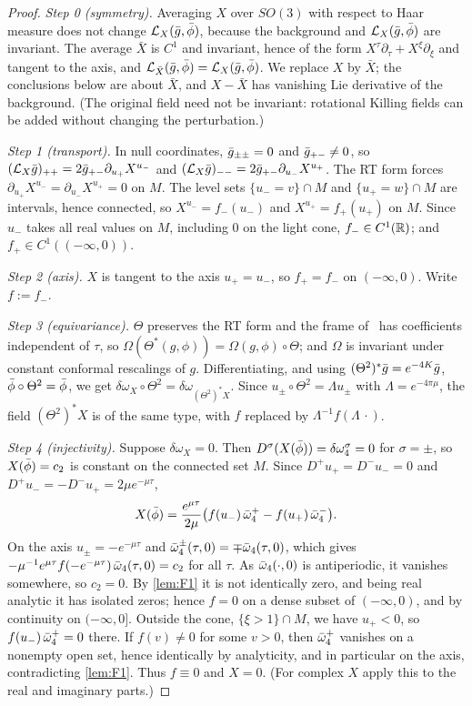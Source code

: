 \begin{proof}
\emph{Step 0 (symmetry).} Averaging $X$ over $SO(3)$ with respect to Haar measure does not change
$\mathcal{L}_X(\bar g,\bar\phi)$, because the background and $\mathcal{L}_X(\bar g,\bar\phi)$ are invariant. The average $\bar X$ is
$C^1$ and invariant, hence of the form $X^\tau\partial_\tau+X^\xi\partial_\xi$ and tangent to the axis, and
$\mathcal{L}_{\bar X}(\bar g,\bar\phi)=\mathcal{L}_X(\bar g,\bar\phi)$. We replace $X$ by $\bar X$; the conclusions below are about
$\bar X$, and $X-\bar X$ has vanishing Lie derivative of the background. (The original field need not be
invariant: rotational Killing fields can be added without changing the perturbation.)

\emph{Step 1 (transport).} In null coordinates, $\bar g_{\pm\pm}=0$ and $\bar g_{+-}\neq0$, so
$(\mathcal{L}_X\bar g)_{++}=2\bar g_{+-}\partial_{u_+}X^{u_-}$ and $(\mathcal{L}_X\bar g)_{--}=2\bar g_{+-}\partial_{u_-}X^{u_+}$.
The RT form forces $\partial_{u_+}X^{u_-}=\partial_{u_-}X^{u_+}=0$ on $M$. The level sets
$\{u_-=v\}\cap M$ and $\{u_+=w\}\cap M$ are intervals, hence connected, so $X^{u_-}=f_-(u_-)$ and
$X^{u_+}=f_+(u_+)$ on $M$. Since $u_-$ takes all real values on $M$, including $0$ on the light cone,
$f_-\in C^1(\mathbb{R})$; and $f_+\in C^1((-\infty,0))$.

\emph{Step 2 (axis).} $X$ is tangent to the axis $u_+=u_-$, so $f_+=f_-$ on $(-\infty,0)$. Write $f:=f_-$.

\emph{Step 3 (equivariance).} $\Theta$ preserves the RT form and the frame of~\cite{RT2019} has coefficients
independent of $\tau$, so $\Omega(\Theta^*(g,\phi))=\Omega(g,\phi)\circ\Theta$; and $\Omega$ is invariant under
constant conformal rescalings of $g$. Differentiating, and using $(\Theta^2)^*\bar g=e^{-4K}\bar g$,
$\bar\phi\circ\Theta^2=\bar\phi$, we get $\delta\omega_X\circ\Theta^2=\delta\omega_{(\Theta^2)^*X}$. Since
$u_\pm\circ\Theta^2=\Lambda u_\pm$ with $\Lambda=e^{-4\pi\mu}$, the field $(\Theta^2)^*X$ is of the same type,
with $f$ replaced by $\Lambda^{-1}f(\Lambda\,\cdot)$.

\emph{Step 4 (injectivity).} Suppose $\delta\omega_X=0$. Then $D^\sigma(X(\bar\phi))=\delta\omega_4^\sigma=0$
for $\sigma=\pm$, so $X(\bar\phi)=c_2$ is constant on the connected set $M$. Since $D^+u_+=D^-u_-=0$ and
$D^+u_-=-D^-u_+=2\mu e^{-\mu\tau}$,
\[
  X(\bar\phi)=\frac{e^{\mu\tau}}{2\mu}\big(f(u_-)\,\bar\omega_4^+-f(u_+)\,\bar\omega_4^-\big).
\]
On the axis $u_\pm=-e^{-\mu\tau}$ and $\bar\omega_4^\pm(\tau,0)=\mp\bar\omega_4(\tau,0)$, which gives
$-\mu^{-1}e^{\mu\tau}f(-e^{-\mu\tau})\,\bar\omega_4(\tau,0)=c_2$ for all $\tau$. As $\bar\omega_4(\cdot,0)$ is
antiperiodic, it vanishes somewhere, so $c_2=0$. By \cref{lem:F1} it is not identically zero, and being
real analytic it has isolated zeros; hence $f=0$ on a dense subset of $(-\infty,0)$, and by continuity on
$(-\infty,0]$. Outside the cone, $\{\xi>1\}\cap M$, we have $u_+<0$, so $f(u_-)\,\bar\omega_4^+=0$ there. If
$f(v)\neq0$ for some $v>0$, then $\bar\omega_4^+$ vanishes on a nonempty open set, hence identically by
analyticity, and in particular on the axis, contradicting \cref{lem:F1}. Thus $f\equiv0$ and $X=0$. (For
complex $X$ apply this to the real and imaginary parts.)


\end{proof}
